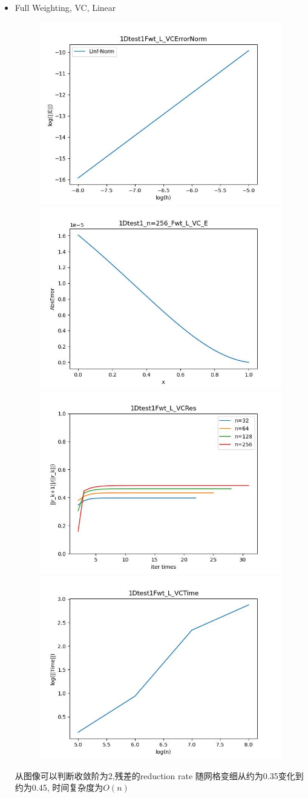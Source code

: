 \documentclass{article}
\begin{document}
\begin{itemize}
    \item Full Weighting, VC, Linear
    \begin{figure}[h]
        \centering
        \includegraphics[width=0.35\linewidth]{1Dtest1Fwt_L_VCErrorNorm.jpg}
        \includegraphics[width=0.35\linewidth]{1Dtest1_n=256_Fwt_L_VC_E.jpg}
        \includegraphics[width=0.35\linewidth]{1Dtest1Fwt_L_VCRes.jpg}
        \includegraphics[width=0.35\linewidth]{1Dtest1Fwt_L_VCTime.jpg}
    \end{figure}
    
    从图像可以判断收敛阶为2,残差的reduction rate 随网格变细从约为0.35变化到约为0.45, 时间复杂度为$O(n)$


\end{itemize}
\end{document}
